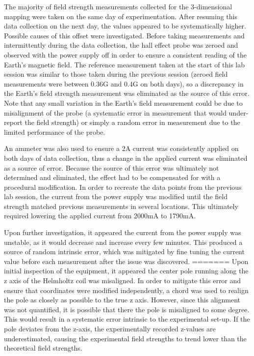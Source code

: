 \documentclass[a4paper]{article}
\begin{document}
The majority of field strength measurements collected for the
3-dimensional mapping were taken on the same day of
experimentation. After resuming this data collection on the next day,
the values appeared to be systematically higher. Possible causes of
this offset were investigated. Before taking measurements and
intermittently during the data collection, the hall effect probe was
zeroed and observed with the power supply off in order to ensure a
consistent reading of the Earth's magnetic field. The reference
measurement taken at the start of this lab session was similar to
those taken during the previous session (zeroed field measurements
were between 0.36G and 0.4G on both days), so a discrepancy in the
Earth's field strength measurement was eliminated as the source of
this error. Note that any small variation in the Earth's field
measurement could be due to misalignment of the probe (a systematic
error in measurement that would under-report the field strength) or
simply a random error in measurement due to the limited performance of
the probe.

An ammeter was also used to ensure a 2A current was consistently
applied on both days of data collection, thus a change in the applied
current was eliminated as a source of error. Because the source of
this error was ultimately not determined and eliminated, the effect
had to be compensated for with a procedural modification. In order to
recreate the data points from the previous lab session, the current
from the power supply was modified until the field strength matched
previous measurements in several locations. This ultimately required
lowering the applied current from 2000mA to 1790mA.

Upon further investigation, it appeared the current from the power
supply was unstable, as it would decrease and increase every few
minutes. This produced a source of random intrinsic error, which was
mitigated by fine tuning the current value before each measurement
after the issue was discovered.
=======
\qq Upon initial inspection of the equipment, it appeared the center pole running
along the z axis of the Helmholtz coil was misaligned. In order to mitigate this
error and ensure that coordinates were modified independently, a chord was used
to realign the pole as closely as possible to the true z axis. However, since
this alignment was not quantified, it is possible that there the pole is
misaligned to some degree. This would result in a systematic error intrinsic to
the experimental set-up. If the pole deviates from the z-axis, the
experimentally recorded z-values are underestimated, causing the experimental
field strengths to trend lower than the theoretical field strengths.
\end{document}
